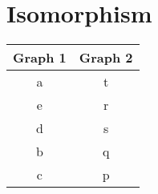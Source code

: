 \section{Isomorphism}

\begin{center}
\begin{tabular}{|c|c|}
\hline Graph 1 & Graph 2 \\ \hline 
\hline a & t \\ \hline 
\hline e & r \\ \hline 
\hline d & s \\ \hline 
\hline b & q \\ \hline 
\hline c & p \\ 
\hline 
\end{tabular} 
\end{center}
